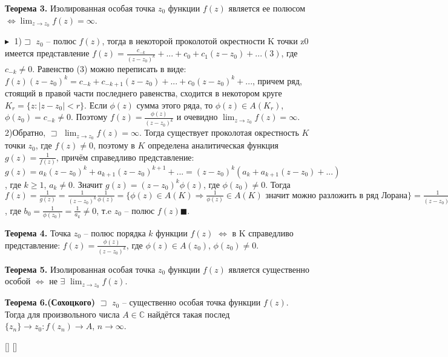 \textbf{Теорема 3.} Изолированная особая точка $z_0$ функции $f(z)$ является ее полюсом $\Longleftrightarrow \displaystyle\lim_{z\rightarrow z_0}f(z)=\infty$.

$\blacktriangleright\;$
    1)$\sqsupset$ $z_0$ – полюс $f(z)$, тогда в некоторой проколотой окрестности K точки z0 имеется представление $f(z)=\frac{c_{-k}}{(z-z_0)^k}+...+c_0+c_1(z-z_0)+...(3)$,
    где $c_{-k}\neq0$. Равенство (3) можно переписать в виде:
    $f(z)(z-z_0)^k=c_{-k}+c_{-k+1}(z-z_0)+...+c_0(z-z_0)^k+...$, причем ряд, стоящий в правой части последнего равенства, сходится в некотором круге $K_r=\{z:|z-z_0|<r\}$. Если $\phi(z)$ сумма этого ряда, то $\phi(z) \in A(K_r)$, $\phi(z_0)=c_{-k}\neq0$. Поэтому $f(z)=\frac{\phi(z)}{(z-z_0)^k}$ и очевидно $\displaystyle\lim_{z\rightarrow z_0}f(z)=\infty$.
    2)Обратно, $\sqsupset$ $\displaystyle\lim_{z\rightarrow z_0}f(z)=\infty$. Тогда существует
    проколотая окрестность $K$ точки $z_0$, где $f(z) \neq 0$, поэтому
    в $K$ определена аналитическая функция $g(z) = \frac{1}{f(z)}$, причём справедливо представление: $g(z)=a_k(z-z_0)^k+a_{k+1}(z-z_0)^{k+1}+...=(z-z_0)^k(a_k+a_{k+1}(z-z_0)+...)$, где $k\geq1$, $a_k\neq0$. Значит $g(z)=(z-z_0)^k\phi(z)$, где $\phi(z_0)\neq0$. Тогда $f(z)=\frac{1}{g(z)}=\frac{1}{(z-z_0)^k}\frac{1}{\phi(z)}=\{\phi(z) \in A(K) \Rightarrow \frac{1}{\phi(z)} \in A(K) \text{ значит можно разложить в ряд Лорана}\}=
    \frac{1}{(z-z_0)^k}(b_0+b_1(z-z_0)+...)$, где $b_0=\frac{1}{\phi(z_0)}=\frac{1}{a_k}\neq0$, т.e $z_0$ -- полюс $f(z) \blacksquare$.
    
\textbf{Теорема 4.} Точка $z_0$ – полюс порядка $k$ функции $f(z)$ $\Longleftrightarrow$ в K справедливо представление: $f(z)=\frac{\phi(z)}{(z-z_0)^k}$, где $\phi(z)\in A(z_0)$, $\phi(z_0)\neq 0$.

\textbf{Теорема 5.} Изолированная особая точка $z_0$ функции
 $f(z)$ является существенно особой $\Longleftrightarrow$ не $\exists$ $\displaystyle\lim_{z\rightarrow z_0}f(z)$.

\textbf{Теорема 6.(Сохоцкого)} $\sqsupset$ $z_0$ – существенно особая точка функции $f(z)$. Тогда
для произвольного числа $A \in \mathbb{C}$ найдётся такая послед $\{z_n\}\rightarrow z_0:f(z_n)\rightarrow A$, $n \rightarrow \infty$.

[\cite{tfkp_stud_ticket}]
[\cite{tfkp_msu}]